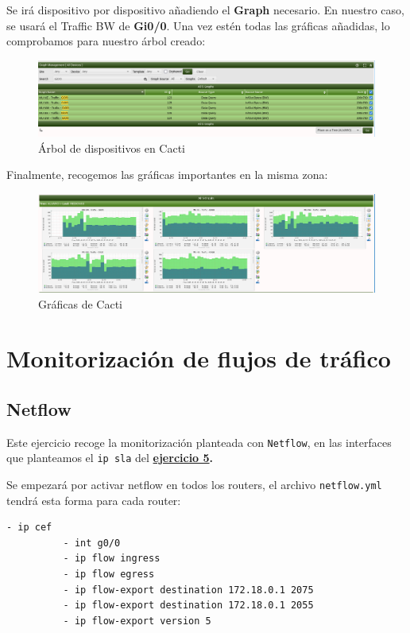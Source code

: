 \documentclass[11pt]{article}
\begin{document}
Se irá dispositivo por dispositivo añadiendo el \textbf{Graph} necesario. En nuestro caso, se usará el Traffic BW de \textbf{Gi0/0}. Una vez estén todas las gráficas añadidas, lo comprobamos para nuestro árbol creado:

\begin{figure}[h]
    \centering
    \includegraphics[width=\textwidth]{src/cactigraphs.png}
    \caption{Árbol de dispositivos en Cacti}
\end{figure}

Finalmente, recogemos las gráficas importantes en la misma zona:

\begin{figure}[h]
    \centering
    \includegraphics[width=\textwidth]{src/finalgraphs.png}
    \caption{Gráficas de Cacti}
\end{figure}



\section{Monitorización de flujos de tráfico}
\subsection{Netflow}

Este ejercicio recoge la monitorización planteada con \texttt{Netflow}, en las interfaces que planteamos el \texttt{ip sla} del  \textbf{\hyperref[section:Generacion de trafico Cisco IP SLA]{ejercicio 5}.}

Se empezará por activar netflow en todos los routers, el archivo \texttt{netflow.yml} tendrá esta forma para cada router:


\begin{tcolorbox}[
    boxrule=0pt,
    title=Formato de configuración netflow.yml,
]
    \begin{lstlisting}[gobble=6]
          - ip cef
          - int g0/0
          - ip flow ingress
          - ip flow egress
          - ip flow-export destination 172.18.0.1 2075
          - ip flow-export destination 172.18.0.1 2055
          - ip flow-export version 5
    \end{lstlisting}
\end{tcolorbox}
\end{document}
